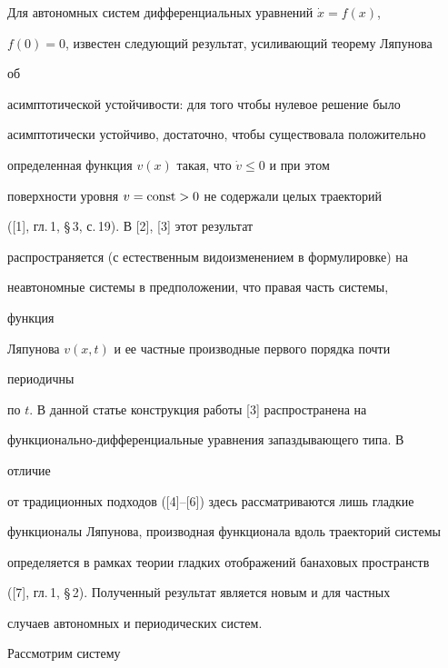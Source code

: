 

\maketitle


\label{begin}





Для автономных систем дифференциальных уравнений $\Dot x=f(x)$,


$f(0)=0$, известен следующий результат, усиливающий теорему Ляпунова


об


асимптотической устойчивости: для того чтобы нулевое решение было


асимптотически устойчиво, достаточно, чтобы существовала положительно


определенная функция $v(x)$ такая, что $\Dot v\leqslant 0$ и при этом


поверхности уровня $v=\operatorname{const}>0$ не содержали целых траекторий


([1], гл.\,1, \S\,3, с.\,19). В [2], [3] этот результат


распространяется (с естественным видоизменением в формулировке) на


неавтономные системы в предположении, что правая часть системы,


функция


Ляпунова $v(x,t)$ и ее частные производные первого порядка почти


периодичны


по $t$. В данной статье конструкция работы [3] распространена на


функционально-дифференциальные уравнения запаздывающего типа. В


отличие


от традиционных подходов ([4]--[6]) здесь рассматриваются лишь гладкие


функционалы Ляпунова, производная функционала вдоль траекторий системы


определяется в рамках теории гладких отображений банаховых пространств


([7], гл.\,1, \S\,2). Полученный результат является новым и для частных


случаев автономных и периодических систем.





Рассмотрим систему


